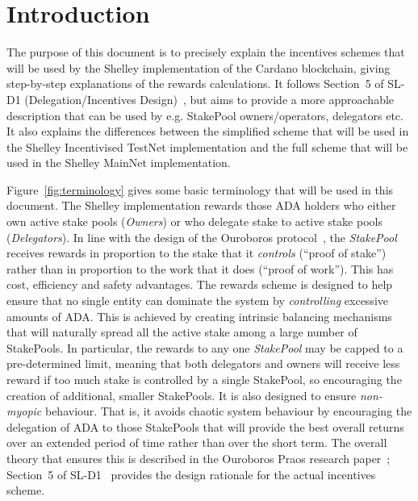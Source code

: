 \documentclass[11pt,a4paper,dvipsnames,twosided,final]{article}
\newcommand{\ada}{ADA{}}
\newcommand{\cardano}[1]{Cardano}
\begin{document}
\thispagestyle{empty}
\clearpage
\pagestyle{myheadings}
\renewcommand{\thepage}{\arabic{page}}
\setcounter{page}{1}
\section{Introduction}
\label{sec:introduction}

The purpose of this document is to precisely explain the incentives schemes that will be used by the Shelley implementation
of the \cardano{} blockchain, giving step-by-step explanations of the rewards calculations.
It follows Section~5 of SL-D1 (Delegation/Incentives Design)~\cite{delegation_design}, but aims to provide a more approachable
description that can be used by e.g. StakePool owners/operators, delegators etc.
It also explains the differences between the simplified scheme that will be used in the Shelley Incentivised TestNet implementation and the
full scheme that will be used in the Shelley MainNet implementation.

Figure~\ref{fig:terminology} gives some basic terminology that will be used in this document.
The Shelley implementation rewards those \ada{} holders who either own active stake pools
(\emph{Owners}) or who delegate stake to active stake pools (\emph{Delegators}).
In line with the design of the Ouroboros protocol~\cite{ouroboros_classic}, the \emph{StakePool} receives
rewards in proportion to the stake that it \emph{controls} (``proof of
stake'') rather than in proportion to the work that it does (``proof of work'').
This has cost, efficiency and safety advantages.
The rewards scheme is designed to help ensure that no single entity can
dominate the system by \emph{controlling} excessive amounts of \ada{}.  This is achieved by creating intrinsic
balancing mechanisms that will naturally spread all the active stake among a large number of StakePools.
In particular, the rewards to any one \emph{StakePool} may be capped to a pre-determined limit,
meaning that both delegators and owners will receive less reward if too much stake is controlled by a single StakePool,
so encouraging the creation of additional, smaller StakePools.
It is also designed to ensure \emph{non-myopic} behaviour.  That is, it avoids chaotic system behaviour by encouraging the delegation of \ada{} to those StakePools that will provide
the best overall returns over an extended period of time rather than over the short term.
The overall theory that ensures this is described in the Ouroboros Praos research
paper~\cite{ouroboros_praos}; Section~5 of SL-D1~\cite{delegation_design} provides the design rationale
for the actual incentives scheme.
\end{document}
